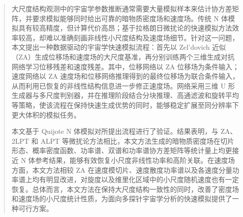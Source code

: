 

\begin{abstract}

  大尺度结构观测中的宇宙学参数推断通常需要大量模拟样本来估计协方差矩阵，并要求模拟能够同时给出可靠的暗物质密度场和速度场。传统 N 体模拟具有较高精度，但计算代价高昂；基于拉格朗日微扰论的快速模拟方法效率较高，却难以准确刻画非线性小尺度结构及速度场细节。针对这一问题，本文提出一种数据驱动的宇宙学快速模拟流程：首先以 Zel'dovich 近似（ZA）生成位移场和速度场的大尺度基准，再分别训练两个三维生成对抗网络学习位移残差和速度残差。其中，位移网络以 ZA 位移场为条件输入；速度网络以 ZA 速度场和位移网络推理得到的最终位移场为联合条件输入，从而利用已恢复的非线性结构信息进一步修正速度场。网络采用三维 U 形生成器与多尺度判别器，并在推理阶段结合分块推理、高通滤波和旋转平均等策略，使该流程在保持快速生成优势的同时，能够稳定扩展至同分辨率下更大体积的模拟任务。

  本文基于 Quijote N 体模拟对所提出流程进行了验证。结果表明，与 ZA、2LPT 和 ALPT 等微扰论方法相比，本文方法生成的暗物质密度场在切片形态、概率密度函数、功率谱、双谱和功率谱协方差矩阵等统计量上均更接近 N 体参考结果，能够有效恢复小尺度非线性功率和高阶关联。在速度场方面，本文方法相较 ZA 在速度模切片、速度散度功率谱以及各速度分量功率谱上均有明显改进，对旋度以及维里化区域中的小尺度随机速度也有一定恢复。总体而言，本文方法在保持大尺度结构一致性的同时，改善了密度场和速度场的小尺度统计性质，为面向多探针宇宙学分析的快速模拟提供了一种可行方案。

\end{abstract}

